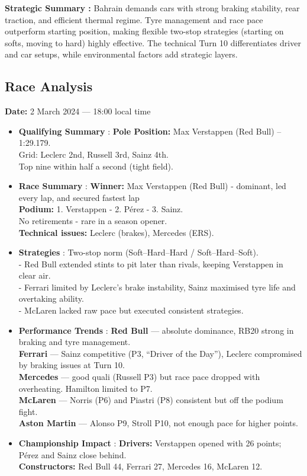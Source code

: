 \textbf{Strategic Summary :}
Bahrain demands cars with strong braking stability, rear traction, and efficient thermal regime. Tyre management and race pace outperform starting position, making flexible two-stop strategies (starting on softs, moving to hard) highly effective. The technical Turn 10 differentiates driver and car setups, while environmental factors add strategic layers.


\subsection{Race Analysis}

\textbf{Date:} 2 March 2024 — 18:00 local time 

\begin{itemize}
    \item \textbf{Qualifying Summary} : \textbf{Pole Position:} Max Verstappen (Red Bull) – 1:29.179. \\
    Grid: Leclerc 2nd, Russell 3rd, Sainz 4th.\\
    Top nine within half a second (tight field).
    
    \item \textbf{Race Summary} : \textbf{Winner:} Max Verstappen (Red Bull) - dominant, led every lap, and secured fastest lap\\
    \textbf{Podium:} 1. Verstappen - 2. Pérez - 3. Sainz.\\
    No retirements - rare in a season opener.\\
    \textbf{Technical issues:} Leclerc (brakes), Mercedes (ERS).
    
    \item \textbf{Strategies} : Two-stop norm (Soft–Hard–Hard / Soft–Hard–Soft). \\
    - Red Bull extended stints to pit later than rivals, keeping Verstappen in clear air. \\
    - Ferrari limited by Leclerc’s brake instability, Sainz maximised tyre life and overtaking ability. \\
    - McLaren lacked raw pace but executed consistent strategies.
    
    \item \textbf{Performance Trends} : \textbf{Red Bull} — absolute dominance, RB20 strong in braking and tyre management. \\
    \textbf{Ferrari} — Sainz competitive (P3, “Driver of the Day”), Leclerc compromised by braking issues at Turn 10. \\
    \textbf{Mercedes} — good quali (Russell P3) but race pace dropped with overheating. Hamilton limited to P7. \\
    \textbf{McLaren} — Norris (P6) and Piastri (P8) consistent but off the podium fight. \\
    \textbf{Aston Martin} — Alonso P9, Stroll P10, not enough pace for higher points. 
    
    \item \textbf{Championship Impact} : \textbf{Drivers:} Verstappen opened with 26 points; Pérez and Sainz close behind.\\
    \textbf{Constructors:} Red Bull 44, Ferrari 27, Mercedes 16, McLaren 12.    
\end{itemize}

